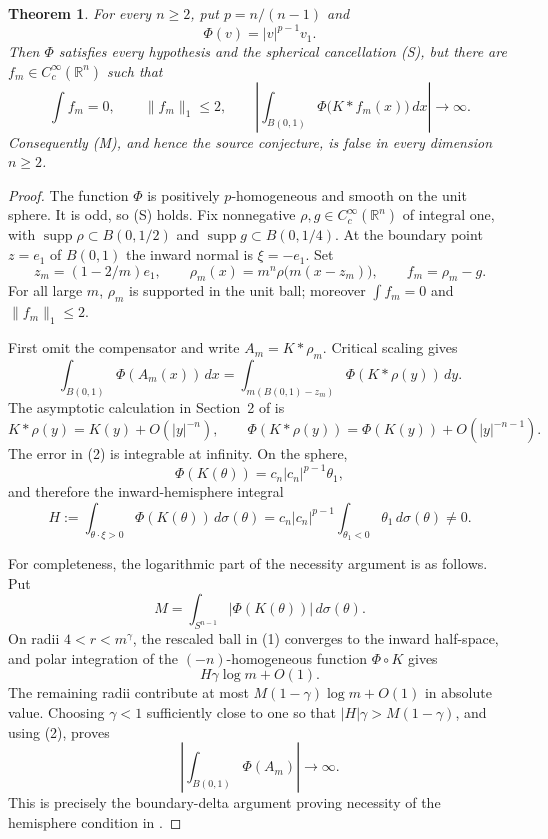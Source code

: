 \documentclass[11pt]{article}
\newtheorem{theorem}{Theorem}
\newcommand{\Rn}{\mathbb R^n}
\begin{document}
\begin{theorem}\label{thm:counterexample}
For every $n\ge2$, put $p=n/(n-1)$ and
\[
 \Phi(v)=|v|^{p-1}v_1.
\]
Then $\Phi$ satisfies every hypothesis and the spherical cancellation (S),
but there are $f_m\in C_c^\infty(\Rn)$ such that
\[
 \int f_m=0,\qquad \|f_m\|_1\le2,
 \qquad
 \left|\int_{B(0,1)}\Phi\bigl(K*f_m(x)\bigr)\,dx\right|\longrightarrow\infty.
\]
Consequently (M), and hence the source conjecture, is false in every
dimension $n\ge2$.
\end{theorem}

\begin{proof}
The function $\Phi$ is positively $p$-homogeneous and smooth on the unit
sphere.  It is odd, so (S) holds.  Fix nonnegative
$\rho,g\in C_c^\infty(\Rn)$ of integral one, with
$\operatorname{supp}\rho\subset B(0,1/2)$ and
$\operatorname{supp}g\subset B(0,1/4)$.  At the boundary point
$z=e_1$ of $B(0,1)$ the inward normal is $\xi=-e_1$.  Set
\[
 z_m=(1-2/m)e_1,\qquad
 \rho_m(x)=m^n\rho\bigl(m(x-z_m)\bigr),\qquad f_m=\rho_m-g.
\]
For all large $m$, $\rho_m$ is supported in the unit ball; moreover
$\int f_m=0$ and $\|f_m\|_1\le2$.

First omit the compensator and write $A_m=K*\rho_m$.  Critical scaling gives
\begin{equation}
 \int_{B(0,1)}\Phi(A_m(x))\,dx
 =\int_{m(B(0,1)-z_m)}\Phi(K*\rho(y))\,dy.                           \tag{1}
\end{equation}
The asymptotic calculation in Section~2 of \cite{Domains} is
\begin{equation}
 K*\rho(y)=K(y)+O(|y|^{-n}),\qquad
 \Phi(K*\rho(y))=\Phi(K(y))+O(|y|^{-n-1}).                          \tag{2}
\end{equation}
The error in (2) is integrable at infinity.  On the sphere,
\[
 \Phi(K(\theta))=c_n|c_n|^{p-1}\theta_1,
\]
and therefore the inward-hemisphere integral
\begin{equation}
 H:=\int_{\theta\cdot\xi>0}\Phi(K(\theta))\,d\sigma(\theta)
 =c_n|c_n|^{p-1}\int_{\theta_1<0}\theta_1\,d\sigma(\theta)\ne0.     \tag{3}
\end{equation}

For completeness, the logarithmic part of the necessity argument is as
follows.  Put
\[
 M=\int_{S^{n-1}}|\Phi(K(\theta))|\,d\sigma(\theta).
\]
On radii
$4<r<m^\gamma$, the rescaled ball in (1) converges to the inward
half-space, and polar integration of the $(-n)$-homogeneous function
$\Phi\circ K$ gives
\[
 H\gamma\log m+O(1).
\]
The remaining radii contribute at most
$M(1-\gamma)\log m+O(1)$ in absolute value.  Choosing
$\gamma<1$ sufficiently close to one so that
$|H|\gamma>M(1-\gamma)$, and using (2), proves
\begin{equation}
 \left|\int_{B(0,1)}\Phi(A_m)\right|\longrightarrow\infty.          \tag{4}
\end{equation}
This is precisely the boundary-delta argument proving necessity of the
hemisphere condition in \cite[Section~2]{Domains}.


\end{proof}
\end{document}
